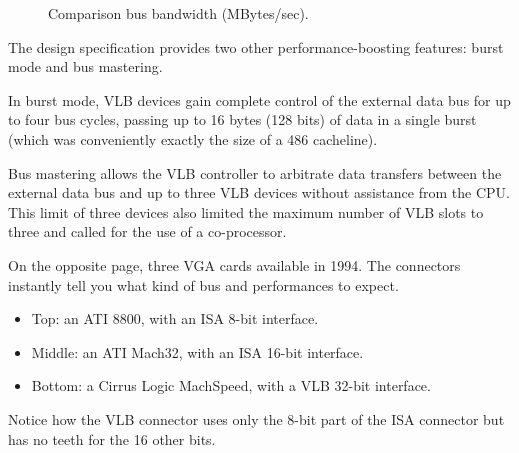 \begin{figure}[H]
\centering
   \caption{Comparison bus bandwidth (MBytes/sec).}
 \end{figure}
\par
The design specification provides two other performance-boosting features: burst mode and bus mastering.\\
\par In burst mode, VLB devices gain complete control of the external data bus for up to four bus cycles, passing up to 16 bytes (128 bits) of data in a single burst (which was conveniently exactly the size of a 486 cacheline).\\
\par Bus mastering allows the VLB controller to arbitrate data transfers between the external data bus and up to three VLB devices without assistance from the CPU. This limit of three devices also limited the maximum number of VLB slots to three and called for the use of a co-processor.\\
\par
On the opposite page, three VGA cards available in 1994. The connectors instantly tell you what kind of bus and performances to expect.\\
\begin{itemize}
\item Top: an ATI 8800, with an ISA 8-bit interface.
\item Middle: an ATI Mach32, with an ISA 16-bit interface.
\item Bottom: a Cirrus Logic MachSpeed, with a VLB 32-bit interface.
\end{itemize}
Notice how the VLB connector uses only the 8-bit part of the ISA connector but has no teeth for the 16 other bits.
 
\\

\vspace{5mm}

\\

\vspace{5mm}




